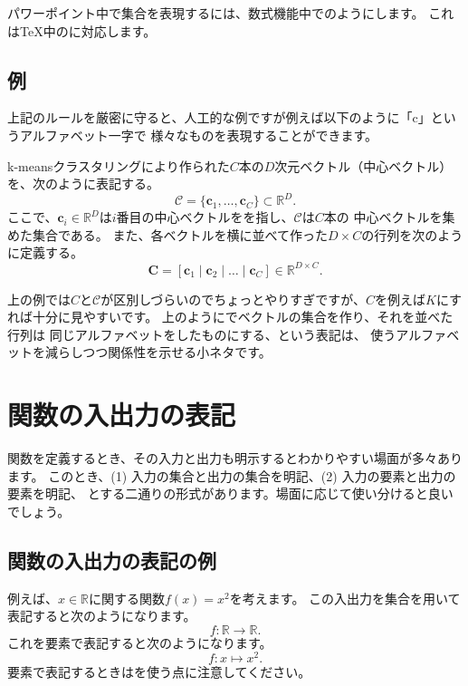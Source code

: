 \documentclass[uplatex,twocolumn,9pt,dvipdfmx]{jsarticle}
\begin{document}
パワーポイント中で集合を表現するには、数式機能中で\texttt{\scriptS}のようにします。
これはTeX中の\texttt{}に対応します。


\subsection{例}

上記のルールを厳密に守ると、人工的な例ですが例えば以下のように「c」というアルファベット一字で
様々なものを表現することができます。

\begin{screen}
    k-meansクラスタリングにより作られた$C$本の$D$次元ベクトル（中心ベクトル）を、次のように表記する。
    \begin{equation}
    \mathcal{C} = \{\mathbf{c}_1, \dots, \mathbf{c}_C \} \subset \mathbb{R}^D.
    \end{equation}
    ここで、$\mathbf{c}_i \in \mathbb{R}^D$は$i$番目の中心ベクトルをを指し、$\mathcal{C}$は$C$本の
    中心ベクトルを集めた集合である。
    また、各ベクトルを横に並べて作った$D \times C$の行列を次のように定義する。
    \begin{equation}
    \mathbf{C} = [\mathbf{c}_1 \mid \mathbf{c}_2 \mid \dots \mid  \mathbf{c}_C] \in \mathbb{R}^{D \times C}.
    \end{equation}
\end{screen}

上の例では$C$と$\mathcal{C}$が区別しづらいのでちょっとやりすぎですが、$C$を例えば$K$にすれば十分に見やすいです。
上のように\texttt{\mathcal}でベクトルの集合を作り、それを並べた行列は
同じアルファベットを\texttt{\mathbf}したものにする、という表記は、
使うアルファベットを減らしつつ関係性を示せる小ネタです。

\section{関数の入出力の表記}

関数を定義するとき、その入力と出力も明示するとわかりやすい場面が多々あります。
このとき、(1) 入力の集合と出力の集合を明記、(2) 入力の要素と出力の要素を明記、
とする二通りの形式があります。場面に応じて使い分けると良いでしょう。

\subsection{関数の入出力の表記の例}
例えば、$x \in \mathbb{R}$に関する関数$f(x) = x^2$を考えます。
この入出力を集合を用いて表記すると次のようになります。
\begin{equation}
    f: \mathbb{R} \to \mathbb{R}.
\end{equation}
これを要素で表記すると次のようになります。
\begin{equation}
    f: x \mapsto x^2.
\end{equation}
要素で表記するときは\texttt{\mapsto}を使う点に注意してください。
\end{document}
